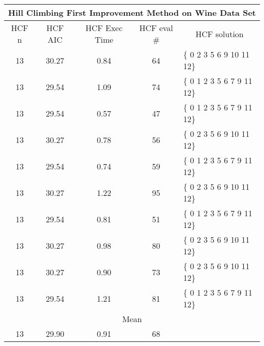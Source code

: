 \begin{tabular}{|c|c|c|c|l|}
	\hline
	\multicolumn{5}{|c|}{Hill Climbing First Improvement Method on Wine Data Set}                         \\ \hline
	HCF n & HCF AIC     & HCF Exec Time & HCF eval \# & \multicolumn{1}{c|}{HCF solution} \\ \hline
	13    & 30.27 & 0.84              & 64                     & \{ 0 2 3 5 6 9 10 11 12\}         \\ \hline
	13    & 29.54 & 1.09              & 74                     & \{ 0 1 2 3 5 6 7 9 11 12\}        \\ \hline
	13    & 29.54 & 0.57              & 47                     & \{ 0 1 2 3 5 6 7 9 11 12\}        \\ \hline
	13    & 30.27 & 0.78              & 56                     & \{ 0 2 3 5 6 9 10 11 12\}         \\ \hline
	13    & 29.54 & 0.74              & 59                     & \{ 0 1 2 3 5 6 7 9 11 12\}        \\ \hline
	13    & 30.27 & 1.22              & 95                     & \{ 0 2 3 5 6 9 10 11 12\}         \\ \hline
	13    & 29.54 & 0.81              & 51                     & \{ 0 1 2 3 5 6 7 9 11 12\}        \\ \hline
	13    & 30.27 & 0.98              & 80                     & \{ 0 2 3 5 6 9 10 11 12\}         \\ \hline
	13    & 30.27 & 0.90              & 73                     & \{ 0 2 3 5 6 9 10 11 12\}         \\ \hline
	13    & 29.54 & 1.21              & 81                     & \{ 0 1 2 3 5 6 7 9 11 12\}        \\ \hline
	\multicolumn{5}{|c|}{Mean}                                                                            \\ \hline
	13    & 29.90 & 0.91             & 68                     &                                   \\ \hline
\end{tabular}

